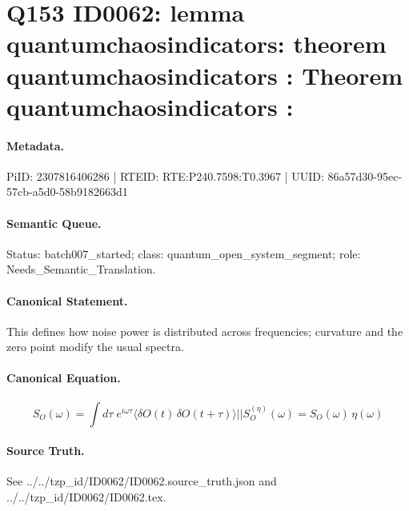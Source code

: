 \section*{Q153 ID0062: lemma quantumchaosindicators: theorem quantumchaosindicators : Theorem quantumchaosindicators :}
\paragraph{Metadata.}
PiID: 2307816406286 | RTEID: RTE:P240.7598:T0.3967 | UUID: 86a57d30-95ec-57cb-a5d0-58b9182663d1

\paragraph{Semantic Queue.}
Status: batch007\_started; class: quantum\_open\_system\_segment; role: Needs\_Semantic\_Translation.

\paragraph{Canonical Statement.}
This defines how noise power is distributed across frequencies; curvature and the zero point modify the usual spectra.

\paragraph{Canonical Equation.}
\[
S_{O}(\omega) = \int d\tau\; e^{i\omega\tau} \langle \delta O(t)\,\delta O(t+\tau)\rangle || S_{O}^{(\eta)}(\omega) = S_{O}(\omega)\,\eta(\omega)
\]

\paragraph{Source Truth.}
See ../../tzp\_id/ID0062/ID0062.source\_truth.json and ../../tzp\_id/ID0062/ID0062.tex.
